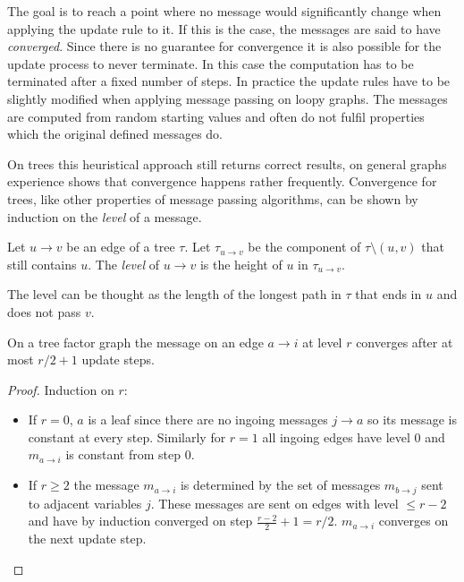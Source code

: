 The goal is to reach a point where no message would significantly change when applying the update rule to it. If this is the case, the messages are said to have \emph{converged}. Since there is no guarantee for convergence it is also possible for the update process to never terminate. In this case the computation has to be terminated after a fixed number of steps. \newline
In practice the update rules have to be slightly modified when applying message passing on loopy graphs. The messages are computed from random starting values and often do not fulfil properties which the original defined messages do. 

On trees this heuristical approach still returns correct results, on general graphs experience shows that convergence happens rather frequently. \newline
Convergence for trees, like other properties of message passing algorithms, can be shown by induction on the \textit{level} of a message.

\begin{definition} Let $u \rightarrow v$ be an edge of a tree $\tau$. \newline
Let $\tau_{u \rightarrow v}$ be the component of $\tau \setminus (u, v)$ that still contains $u$. The \emph{level} of $u \rightarrow v$ is the height of $u$ in $\tau_{u \rightarrow v}$. 
\end{definition}
The level can be thought as the length of the longest path in $\tau$ that ends in $u$ and does not pass $v$.
\begin{lemma}\cite{survprob}
On a tree factor graph the message on an edge $a \rightarrow i$ at level $r$ converges after at most $r/2 + 1$ update steps.
\begin{proof} Induction on $r$:
\begin{itemize}
\item[] If $r = 0$, $a$ is a leaf since there are no ingoing messages $j \rightarrow a$ so its message is constant at every step. \newline
Similarly for $r = 1$ all ingoing edges have level $0$ and $m_{a \rightarrow i}$ is constant from step $0$.
\item[] If $r \geq 2$ the message $m_{a \rightarrow i}$ is determined by the set of messages $m_{b \rightarrow j}$ sent to adjacent variables $j$. These messages are sent on edges with level $\leq r-2$ and have by induction converged on step $\frac{r-2}{2} + 1 = r / 2$. $m_{a \rightarrow i}$ converges on the next update step.
\end{itemize}
\end{proof}
\end{lemma}

